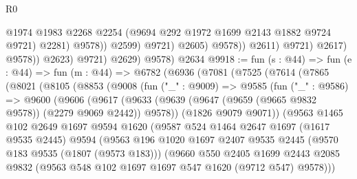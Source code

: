 \begin{lexlean}{R0}
\begin{coremodule}
                                      @1974
                                      @1983
                                      @2268
                                      @2254
                                      (@9694 @292 @1972 @1699 @2143 @1882 @9724 @9721)
                                      @2281)
                                    @9578))
                                @2599)
                              @9721)
                            @2605)
                          @9578))
                      @2611)
                    @9721)
                  @2617)
                @9578))
            @2623)
          @9721)
        @2629)
      @9578)
    @2634
@9918 := fun (s : @44) =>
  fun (e : @44) =>
  fun (m : @44) =>
  @6782
    (@6936
      (@7081
        (@7525
          (@7614
            (@7865
              (@8021
                (@8105
                  (@8853
                    (@9008
                      (fun ("_" : @9009) =>
                      @9585
                        (fun ("_" : @9586) =>
                        @9600
                          (@9606
                            (@9617
                              (@9633
                                (@9639
                                  (@9647 (@9659 (@9665 @9832 @9578)) (@2279 @9069 @2442))
                                  @9578))
                              (@1826 @9079 @9071))
                            (@9563
                              @1465
                              @102
                              @2649
                              @1697
                              @9594
                              @1620
                              (@9587
                                @524
                                @1464
                                @2647
                                @1697
                                (@1617 @9535 @2445)
                                @9594
                                (@9563
                                  @196
                                  @1020
                                  @1697
                                  @2407
                                  @9535
                                  @2445
                                  (@9570 @183 @9535 (@1807 (@9573 @183)))
                                  (@9660
                                    @550
                                    @2405
                                    @1699
                                    @2443
                                    @2085
                                    @9832
                                    (@9563 @548 @102 @1697 @1697 @547 @1620 (@9712 @547) @9578)))

\end{coremodule}
\end{lexlean}
